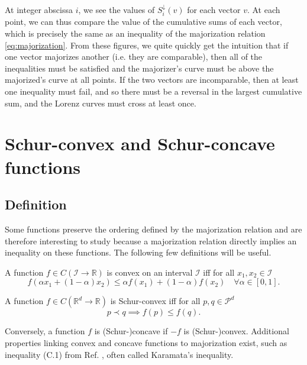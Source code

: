 At integer abscissa $i$, we see the values of $S_i^\downarrow (v)$ for each vector $v$. At each point, we can thus compare the value of the cumulative sums of each vector, which is precisely the same as an inequality of the majorization relation \ref{eq:majorization}. From these figures, we quite quickly get the intuition that if one vector majorizes another (i.e. they are comparable), then all of the inequalities must be satisfied and the majorizer's curve must be above the majorized's curve at all points. If the two vectors are incomparable, then at least one inequality must fail, and so there must be a reversal in the largest cumulative sum, and the Lorenz curves must cross at least once.



\section{Schur-convex and Schur-concave functions}

\subsection{Definition}

Some functions preserve the ordering defined by the majorization relation and are therefore interesting to study because a majorization relation directly implies an inequality on these functions. The following few definitions will be useful.

\begin{definition}
    A function $f \in C(\mathcal{I} \to \mathbb{R})$ is convex on an interval $\mathcal{I}$ iff for all $x_1, x_2 \in \mathcal{I}$
    \begin{equation}
        f(\alpha x_1 + (1-\alpha) x_2) \leq \alpha f(x_1) + (1-\alpha) f(x_2) \quad \forall \alpha \in [0, 1].
    \end{equation}
\end{definition}

\begin{definition}
    A function $f \in C(\mathbb{R}^d \to \mathbb{R})$ is Schur-convex iff for all $p, q \in \mathcal{P}^d$
    \begin{equation}
        p \prec q \implies f(p) \leq f(q).
    \end{equation}
\end{definition}

Conversely, a function $f$ is (Schur-)concave if $-f$ is (Schur-)convex. Additional properties linking convex and concave functions to majorization exist, such as inequality (C.1) from Ref. \cite[p. 92]{marshall_inequalities_2011}, often called Karamata's inequality.


